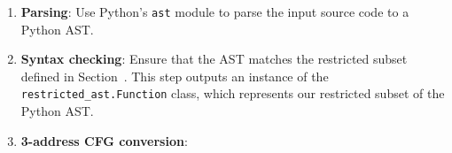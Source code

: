 \begin{enumerate}
  \item
        \textbf{Parsing}:
        Use Python's \texttt{ast} module to parse the input source code to a Python AST.
  \item
        \textbf{Syntax checking}:
        Ensure that the AST matches the restricted subset defined in Section~.
        This step outputs an instance of the \texttt{restricted\_ast.Function} class, which represents our restricted subset of the Python AST.
  \item
        \textbf{3-address CFG conversion}:


\end{enumerate}
